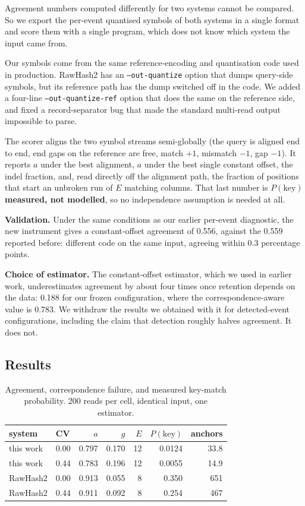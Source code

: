 \documentclass[conference]{IEEEtran}
\begin{document}
Agreement numbers computed differently for two systems cannot be compared. So we export the
per-event quantised symbols of both systems in a single format and score them with a single
program, which does not know which system the input came from.

Our symbols come from the same reference-encoding and quantisation code used in production.
RawHash2 has an \texttt{--out-quantize} option that dumps query-side symbols, but its reference
path has the dump switched off in the code. We added a four-line \texttt{--out-quantize-ref}
option that does the same on the reference side, and fixed a record-separator bug that made the
standard multi-read output impossible to parse.

The scorer aligns the two symbol streams semi-globally (the query is aligned end to end, end
gaps on the reference are free, match $+1$, mismatch $-1$, gap $-1$). It reports $a$ under the
best alignment, $a$ under the best single constant offset, the indel fraction, and, read directly
off the alignment path, the fraction of positions that start an unbroken run of $E$ matching
columns. That last number is $P(\mathrm{key})$ \textbf{measured, not modelled}, so no
independence assumption is needed at all.

\textbf{Validation.} Under the same conditions as our earlier per-event diagnostic, the new
instrument gives a constant-offset agreement of 0.556, against the 0.559 reported before:
different code on the same input, agreeing within 0.3 percentage points.

\textbf{Choice of estimator.} The constant-offset estimator, which we used in earlier work,
underestimates agreement by about four times once retention depends on the data: 0.188 for our
frozen configuration, where the correspondence-aware value is 0.783. We withdraw the results we
obtained with it for detected-event configurations, including the claim that detection roughly
halves agreement. It does not.

\subsection{Results}

\begin{table}[t]
\caption{Agreement, correspondence failure, and measured key-match probability. 200 reads per
cell, identical input, one estimator.}
\label{tab:agree}
\centering
\scriptsize
\begin{tabular}{llrrrrr}
\toprule
system & CV & $a$ & $g$ & $E$ & $P(\mathrm{key})$ & anchors \\
\midrule
this work & 0.00 & 0.797 & 0.170 & 12 & 0.0124 & 33.8 \\
this work & 0.44 & 0.783 & 0.196 & 12 & 0.0055 & 14.9 \\
RawHash2  & 0.00 & 0.913 & 0.055 & 8  & 0.350  & 651 \\
RawHash2  & 0.44 & 0.911 & 0.092 & 8  & 0.254  & 467 \\
\bottomrule
\end{tabular}
\end{table}
\end{document}
